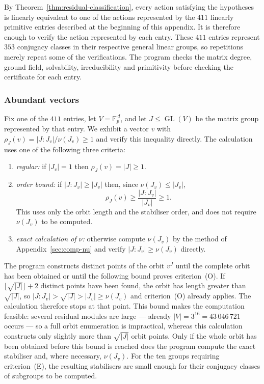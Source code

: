 \documentclass[10pt]{amsart}
\theoremstyle{definition}
\renewcommand{\le}{\leqslant}
\renewcommand{\ge}{\geqslant}
\renewcommand{\leq}{\leqslant}
\let\oldendproof\endproof
\renewenvironment{proof}[1][\proofname]{%
  \oldproof[\bfseries #1]%
}{\oldendproof}
\DeclareMathOperator{\GL}{GL}
\numberwithin{equation}{section}
\numberwithin{table}{section}
\begin{document}
\begin{proof}
By Theorem~\ref{thm:residual-classification}, every action satisfying the
hypotheses is linearly equivalent to one of the actions represented by the
$411$ linearly primitive entries described at the beginning of this appendix.
It is therefore enough to verify the action represented by each entry. These
$411$ entries represent $353$
conjugacy classes in their respective general linear groups, so repetitions
merely repeat some of the
verifications. The program
 checks the matrix degree, ground field,
solvability, irreducibility and primitivity before checking the certificate
for each entry.

\subsubsection*{Abundant vectors}
Fix one of the $411$ entries, let $V=\mathbb{F}_p^{\,d}$, and let
$J\leq\GL(V)$ be the matrix group represented by that entry. We exhibit a
vector $v$ with $\rho_J(v)=|J:J_v|/\nu(J_v)\ge1$ and verify this inequality
directly. The calculation uses one of the following three criteria:
\begin{enumerate}
\item[(R)] \emph{regular:} if $|J_v|=1$ then $\rho_J(v)=|J|\ge1$.
\item[(O)] \emph{order bound:} if $|J:J_v|\ge|J_v|$ then, since $\nu(J_v)\le|J_v|$,
  $$
    \rho_J(v)\ge\frac{|J:J_v|}{|J_v|}\ge1.
  $$
  This uses only the orbit length and the stabiliser order, and does not
  require $\nu(J_v)$ to be computed.
\item[(E)] \emph{exact calculation of $\nu$:} otherwise compute $\nu(J_v)$ by the method of
  Appendix~\ref{sec:comp-nu} and verify $|J:J_v|\ge\nu(J_v)$ directly.
\end{enumerate}
The program constructs distinct points of the orbit $v^J$ until the complete
orbit has been obtained or until the following bound proves criterion~(O). If
$\lfloor\sqrt{|J|}\rfloor+2$ distinct points have been found, the orbit has
length greater than $\sqrt{|J|}$, so
$|J:J_v|>\sqrt{|J|}>|J_v|\ge\nu(J_v)$
and criterion~(O) already applies. The calculation therefore stops at that point.
This bound makes the computation
feasible: several residual modules are large --- already
$|V|=3^{16}=43\,046\,721$ occurs --- so a full orbit enumeration is
impractical, whereas this calculation constructs only slightly more than
$\sqrt{|J|}$ orbit points. Only if the whole orbit has been obtained before
this bound is reached does the program compute the exact stabiliser and, where
necessary, $\nu(J_v)$. For the ten groups requiring criterion~(E), the resulting
stabilisers are small enough for their conjugacy classes of subgroups to be
computed.


\end{proof}
\end{document}
